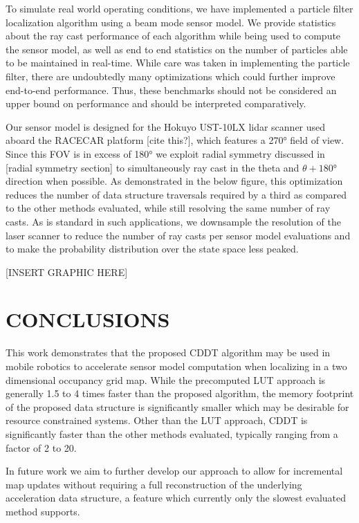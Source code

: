 \documentclass[letterpaper, 10 pt, conference]{ieeeconf}  %
\begin{document}
To simulate real world operating conditions, we have implemented a particle filter localization algorithm using a beam mode sensor model. We provide statistics about the ray cast performance of each algorithm while being used to compute the sensor model, as well as end to end statistics on the number of particles able to be maintained in real-time. While care was taken in implementing the particle filter, there are undoubtedly many optimizations which could further improve end-to-end performance. Thus, these benchmarks should not be considered an upper bound on performance and should be interpreted comparatively.

Our sensor model is designed for the Hokuyo UST-10LX lidar scanner used aboard the RACECAR platform [cite this?], which features a 270° field of view. Since this FOV is in excess of 180° we exploit radial symmetry discussed in [radial symmetry section] to simultaneously ray cast in the theta and $\theta+180°$ direction when possible. As demonstrated in the below figure, this optimization reduces the number of data structure traversals required by a third as compared to the other methods evaluated, while still resolving the same number of ray casts. As is standard in such applications, we downsample the resolution of the laser scanner to reduce the number of ray casts per sensor model evaluations and to make the probability distribution over the state space less peaked.

[INSERT GRAPHIC HERE]

\section{CONCLUSIONS}

This work demonstrates that the proposed CDDT algorithm may be used in mobile robotics to accelerate sensor model computation when localizing in a two dimensional occupancy grid map. While the precomputed LUT approach is generally 1.5 to 4 times faster than the proposed algorithm, the memory footprint of the proposed data structure is significantly smaller which may be desirable for resource constrained systems. Other than the LUT approach, CDDT is significantly faster than the other methods evaluated, typically ranging from a factor of 2 to 20.

In future work we aim to further develop our approach to allow for incremental map updates without requiring a full reconstruction of the underlying acceleration data structure, a feature which currently only the slowest evaluated method supports.
\end{document}
